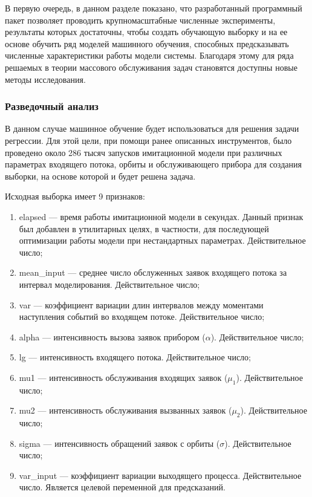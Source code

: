 В первую очередь, в данном разделе показано, что разработанный программный пакет позволяет проводить крупномасштабные численные эксперименты, результаты которых достаточны, чтобы создать обучающую выборку и на ее основе обучить ряд моделей машинного обучения, способных предсказывать численные характеристики работы модели системы. Благодаря этому для ряда решаемых в теории массового обслуживания задач становятся доступны новые методы исследования.

\subsubsection{Разведочный анализ}
В данном случае машинное обучение будет использоваться для решения задачи регрессии. Для этой цели, при помощи ранее описанных инструментов, было проведено около 286 тысяч запусков имитационной модели при различных параметрах входящего потока, орбиты и обслуживающего прибора для создания выборки, на основе которой и будет решена задача.

Исходная выборка имеет 9 признаков:
\begin{enumerate}
	\item elapsed --- время работы имитационной модели в секундах. Данный признак был добавлен в утилитарных целях, в частности, для последующей оптимизации работы модели при нестандартных параметрах. Действительное число;
	\item mean\_input --- среднее число обслуженных заявок входящего потока за интервал моделирования. Действительное число;
	\item var --- коэффициент вариации длин интервалов между моментами наступления событий во входящем потоке. Действительное число;
	\item alpha --- интенсивность вызова заявок прибором ($\alpha$). Действительное число;
	\item lg --- интенсивность входящего потока. Действительное число;
	\item mu1 --- интенсивность обслуживания входящих заявок ($\mu_1$). Действительное число;
	\item mu2 --- интенсивность обслуживания вызванных заявок ($\mu_2$). Действительное число;
	\item sigma --- интенсивность обращений заявок с орбиты ($\sigma$). Действительное число;
	\item var\_input --- коэффициент вариации выходящего процесса. Действительное число. Является целевой переменной для предсказаний.
\end{enumerate}

